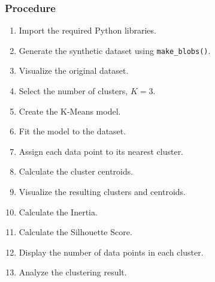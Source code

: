 \documentclass[a4paper,11pt]{article}
\begin{document}
\subsubsection{Procedure}
\begin{enumerate}
    \item Import the required Python libraries.
    \item Generate the synthetic dataset using \texttt{make\_blobs()}.
    \item Visualize the original dataset.
    \item Select the number of clusters, $K = 3$.
    \item Create the K-Means model.
    \item Fit the model to the dataset.
    \item Assign each data point to its nearest cluster.
    \item Calculate the cluster centroids.
    \item Visualize the resulting clusters and centroids.
    \item Calculate the Inertia.
    \item Calculate the Silhouette Score.
    \item Display the number of data points in each cluster.
    \item Analyze the clustering result.
\end{enumerate}
\end{document}
